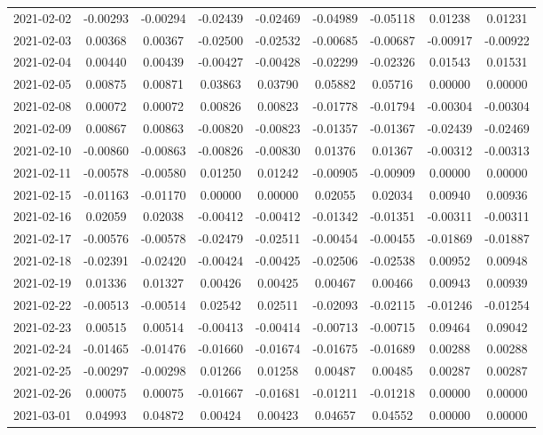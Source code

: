 \begin{footnotesize}
\begin{longtable}{lcccccccc}
2021-02-02 & -0.00293 & -0.00294 & -0.02439 & -0.02469 & -0.04989 & -0.05118 & 0.01238 & 0.01231 \\
2021-02-03 & 0.00368 & 0.00367 & -0.02500 & -0.02532 & -0.00685 & -0.00687 & -0.00917 & -0.00922 \\
2021-02-04 & 0.00440 & 0.00439 & -0.00427 & -0.00428 & -0.02299 & -0.02326 & 0.01543 & 0.01531 \\
2021-02-05 & 0.00875 & 0.00871 & 0.03863 & 0.03790 & 0.05882 & 0.05716 & 0.00000 & 0.00000 \\
2021-02-08 & 0.00072 & 0.00072 & 0.00826 & 0.00823 & -0.01778 & -0.01794 & -0.00304 & -0.00304 \\
2021-02-09 & 0.00867 & 0.00863 & -0.00820 & -0.00823 & -0.01357 & -0.01367 & -0.02439 & -0.02469 \\
2021-02-10 & -0.00860 & -0.00863 & -0.00826 & -0.00830 & 0.01376 & 0.01367 & -0.00312 & -0.00313 \\
2021-02-11 & -0.00578 & -0.00580 & 0.01250 & 0.01242 & -0.00905 & -0.00909 & 0.00000 & 0.00000 \\
2021-02-15 & -0.01163 & -0.01170 & 0.00000 & 0.00000 & 0.02055 & 0.02034 & 0.00940 & 0.00936 \\
2021-02-16 & 0.02059 & 0.02038 & -0.00412 & -0.00412 & -0.01342 & -0.01351 & -0.00311 & -0.00311 \\
2021-02-17 & -0.00576 & -0.00578 & -0.02479 & -0.02511 & -0.00454 & -0.00455 & -0.01869 & -0.01887 \\
2021-02-18 & -0.02391 & -0.02420 & -0.00424 & -0.00425 & -0.02506 & -0.02538 & 0.00952 & 0.00948 \\
2021-02-19 & 0.01336 & 0.01327 & 0.00426 & 0.00425 & 0.00467 & 0.00466 & 0.00943 & 0.00939 \\
2021-02-22 & -0.00513 & -0.00514 & 0.02542 & 0.02511 & -0.02093 & -0.02115 & -0.01246 & -0.01254 \\
2021-02-23 & 0.00515 & 0.00514 & -0.00413 & -0.00414 & -0.00713 & -0.00715 & 0.09464 & 0.09042 \\
2021-02-24 & -0.01465 & -0.01476 & -0.01660 & -0.01674 & -0.01675 & -0.01689 & 0.00288 & 0.00288 \\
2021-02-25 & -0.00297 & -0.00298 & 0.01266 & 0.01258 & 0.00487 & 0.00485 & 0.00287 & 0.00287 \\
2021-02-26 & 0.00075 & 0.00075 & -0.01667 & -0.01681 & -0.01211 & -0.01218 & 0.00000 & 0.00000 \\
2021-03-01 & 0.04993 & 0.04872 & 0.00424 & 0.00423 & 0.04657 & 0.04552 & 0.00000 & 0.00000 \\

\end{longtable}
\end{footnotesize}

